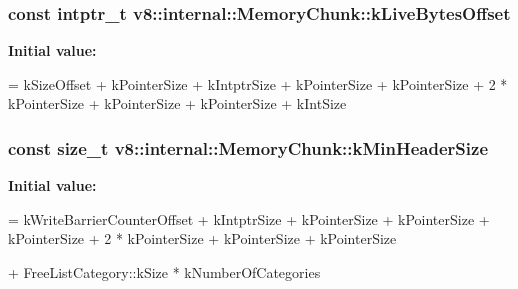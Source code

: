 \subsubsection[{\texorpdfstring{k\+Live\+Bytes\+Offset}{kLiveBytesOffset}}]{\setlength{\rightskip}{0pt plus 5cm}const intptr\+\_\+t v8\+::internal\+::\+Memory\+Chunk\+::k\+Live\+Bytes\+Offset\hspace{0.3cm}{\ttfamily [static]}}\hypertarget{classv8_1_1internal_1_1_memory_chunk_ad250a03190baf4dc4ddccf477d916d89}{}\label{classv8_1_1internal_1_1_memory_chunk_ad250a03190baf4dc4ddccf477d916d89}
{\bfseries Initial value\+:}
\begin{DoxyCode}
=
      kSizeOffset + kPointerSize  
      + kIntptrSize               
      + kPointerSize              
      + kPointerSize              
      + 2 * kPointerSize          
      + kPointerSize              
      + kPointerSize              
      + kIntSize
\end{DoxyCode}
\subsubsection[{\texorpdfstring{k\+Min\+Header\+Size}{kMinHeaderSize}}]{\setlength{\rightskip}{0pt plus 5cm}const size\+\_\+t v8\+::internal\+::\+Memory\+Chunk\+::k\+Min\+Header\+Size\hspace{0.3cm}{\ttfamily [static]}}\hypertarget{classv8_1_1internal_1_1_memory_chunk_abeb0e02cd8a07148f8ebd62935f6bf4f}{}\label{classv8_1_1internal_1_1_memory_chunk_abeb0e02cd8a07148f8ebd62935f6bf4f}
{\bfseries Initial value\+:}
\begin{DoxyCode}
=
      kWriteBarrierCounterOffset +
      kIntptrSize         
      + kPointerSize      
      + kPointerSize      
      + kPointerSize      
      + 2 * kPointerSize  
      + kPointerSize      
      + kPointerSize      
      
      + FreeListCategory::kSize * kNumberOfCategories
\end{DoxyCode}
